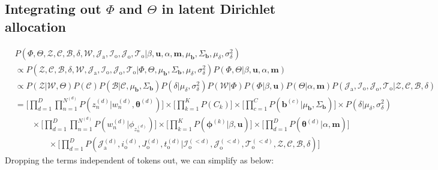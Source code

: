\documentclass[a4paper]{article}
\begin{document}
  \subsection{Integrating out $\Phi$ and $\Theta$ in latent Dirichlet allocation}\label{subsec: phitheta integration}
  \begin{equation*}
  \begin{aligned}
   &  P(\Phi, \Theta, \mathcal{Z}, \mathcal{C}, \mathcal{B}, \delta, \mathcal{W}, \mathcal{J}_{\mbox{a}}, \mathcal{I}_{\mbox{o}}, \mathcal{J}_{\mbox{o}}, \mathcal{T}_{\mbox{o}}| \beta, \boldsymbol{u}, \alpha, \boldsymbol{m}, \mu_{\boldsymbol{b}}, \Sigma_{\boldsymbol{b}}, \mu_\delta, \sigma^2_\delta) \\& 
   \propto P( \mathcal{Z}, \mathcal{C}, \mathcal{B},  \delta, \mathcal{W}, \mathcal{J}_{\mbox{a}}, \mathcal{I}_{\mbox{o}}, \mathcal{J}_{\mbox{o}}, \mathcal{T}_{\mbox{o}}|\Phi, \Theta, \mu_{\boldsymbol{b}}, \Sigma_{\boldsymbol{b}}, \mu_\delta, \sigma^2_\delta)P(\Phi, \Theta| \beta, \boldsymbol{u}, \alpha, \boldsymbol{m})
   \\& 
 \propto P(\mathcal{Z}|\mathcal{W},\Theta)P(\mathcal{C})P(\mathcal{B}|\mathcal{C}, \mu_{\boldsymbol{b}}, \Sigma_{\boldsymbol{b}})P(\delta|\mu_\delta, \sigma^2_\delta)P(\mathcal{W}|\Phi)P(\Phi| \beta, \boldsymbol{u})P(\Theta|\alpha, \boldsymbol{m})P(\mathcal{J}_{\mbox{a}}, \mathcal{I}_{\mbox{o}}, \mathcal{J}_{\mbox{o}}, \mathcal{T}_{\mbox{o}} |\mathcal{Z}, \mathcal{C}, \mathcal{B}, \delta)
  \\&=\Big[\prod_{d=1}^{D}\prod_{n=1}^{N^{(d)}} P( z_n^{(d)}|w_n^{(d)},  \boldsymbol{\theta}^{(d)})\Big]\times \Big[\prod_{k=1}^{K} P(C_k)\Big] \times\Big[\prod_{c=1}^{C} P( \boldsymbol{b}^{(c)}| \mu_{\boldsymbol{b}}, \Sigma_{\boldsymbol{b}})\Big] \times P(\delta|\mu_\delta, \sigma^2_\delta)\\&\quad \quad\times \Big[\prod_{d=1}^{D}\prod_{n=1}^{N^{(d)}} P(w_n^{(d)}| \phi_{z_n^{(d)}})\Big]\times \Big[\prod_{k=1}^{K} P( \boldsymbol{\phi}^{(k)}| \beta, \boldsymbol{u})\Big]\times \Big[\prod_{d=1}^{D} P( \boldsymbol{\theta}^{(d)}|\alpha, \boldsymbol{m})\Big]\\&\quad \quad\quad \quad\times\Big[\prod_{d=1}^{D} P(\mathcal{J}^{(d)}_{\mbox{a}}, i^{(d)}_{\mbox{o}}, J^{(d)}_{\mbox{o}}, t^{(d)}_{\mbox{o}} |\mathcal{I}^{(<d)}_{\mbox{o}}, \mathcal{J}^{(<d)}_{\mbox{o}}, \mathcal{T}^{(<d)}_{\mbox{o}},\mathcal{Z}, \mathcal{C}, \mathcal{B}, \delta)\Big] 
  \end{aligned}
  \end{equation*}
  Dropping the terms independent of tokens out, we can simplify as below:
\end{document}
